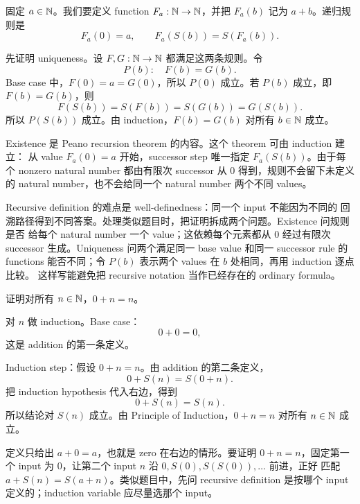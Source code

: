 \begin{solution}
固定 \(a\in\mathbb{N}\)。我们要定义 function \(F_a:\mathbb{N}\to\mathbb{N}\)，并把 \(F_a(b)\) 记为
\(a+b\)。递归规则是
\[
  F_a(0)=a,\qquad F_a(S(b))=S(F_a(b)).
\]

先证明 uniqueness。设 \(F,G:\mathbb{N}\to\mathbb{N}\) 都满足这两条规则。令
\[
  P(b):\quad F(b)=G(b).
\]
Base case 中，\(F(0)=a=G(0)\)，所以 \(P(0)\) 成立。若 \(P(b)\) 成立，即
\(F(b)=G(b)\)，则
\[
  F(S(b))=S(F(b))=S(G(b))=G(S(b)).
\]
所以 \(P(S(b))\) 成立。由 induction，\(F(b)=G(b)\) 对所有 \(b\in\mathbb{N}\) 成立。

Existence 是 Peano recursion theorem 的内容。这个 theorem 可由 induction 建立：
从 value \(F_a(0)=a\) 开始，successor step 唯一指定 \(F_a(S(b))\)。由于每个
nonzero natural number 都由有限次 successor 从 \(0\) 得到，规则不会留下未定义
的 natural number，也不会给同一个 natural number 两个不同 values。
\end{solution}

\begin{explanation}
Recursive definition 的难点是 well-definedness：同一个 input 不能因为不同的
回溯路径得到不同答案。处理类似题目时，把证明拆成两个问题。Existence 问规则是否
给每个 natural number 一个 value；这依赖每个元素都从 \(0\) 经过有限次 successor
生成。Uniqueness 问两个满足同一 base value 和同一 successor rule 的 functions
能否不同；令 \(P(b)\) 表示两个 values 在 \(b\) 处相同，再用 induction 逐点比较。
这样写能避免把 recursive notation 当作已经存在的 ordinary formula。
\end{explanation}

\begin{exerciseblock}
证明对所有 \(n\in\mathbb{N}\)，\(0+n=n\)。
\end{exerciseblock}

\begin{solution}
对 \(n\) 做 induction。Base case：
\[
  0+0=0,
\]
这是 addition 的第一条定义。

Induction step：假设 \(0+n=n\)。由 addition 的第二条定义，
\[
  0+S(n)=S(0+n).
\]
把 induction hypothesis 代入右边，得到
\[
  0+S(n)=S(n).
\]
所以结论对 \(S(n)\) 成立。由 Principle of Induction，\(0+n=n\) 对所有
\(n\in\mathbb{N}\) 成立。
\end{solution}

\begin{explanation}
定义只给出 \(a+0=a\)，也就是 zero 在右边的情形。要证明 \(0+n=n\)，固定第一个
input 为 \(0\)，让第二个 input \(n\) 沿 \(0,S(0),S(S(0)),\ldots\) 前进，正好
匹配 \(a+S(n)=S(a+n)\)。类似题目中，先问 recursive definition 是按哪个 input
定义的；induction variable 应尽量选那个 input。
\end{explanation}

